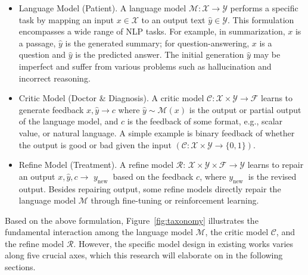 \documentclass[a4paper,oneside]{book}
\begin{document}
\begin{itemize}
    \item Language Model (Patient). A language model $\mathcal{M}: \mathcal{X} \rightarrow \mathcal{Y}$ performs a specific task by mapping an input $x \in \mathcal{X}$ to an output text $\hat{y} \in \mathcal{Y}$. This formulation encompasses a wide range of NLP tasks. For example, in summarization, $x$ is a passage, $\hat{y}$ is the generated summary; for question-answering, $x$ is a question and $\hat{y}$ is the predicted answer. The initial generation $\hat{y}$ may be imperfect and suffer from various problems such as hallucination and incorrect reasoning.

    \item Critic Model (Doctor \& Diagnosis). A critic model $\mathcal{C}: \mathcal{X} \times \mathcal{Y} \rightarrow \mathcal{F}$ learns to generate feedback $x, \hat{y} \rightarrow c$ where $\hat{y} \sim \mathcal{M}(x)$ is the output or partial output of the language model, and $c$ is the feedback of some format, e.g., scalar value, or natural language. A simple example is binary feedback of whether the output is good or bad given the input $(\mathcal{C}: \mathcal{X} \times \mathcal{Y} \rightarrow\{0,1\})$.

    \item Refine Model (Treatment). A refine model $\mathcal{R}$: $\mathcal{X} \times \mathcal{Y} \times \mathcal{F} \rightarrow \mathcal{Y}$ learns to repair an output $x, \hat{y}, c \rightarrow$ $y_{\text {new }}$ based on the feedback $c$, where $y_{\text {new }}$ is the revised output. Besides repairing output, some refine models directly repair the language model $\mathcal{M}$ through fine-tuning or reinforcement learning.
\end{itemize}

Based on the above formulation, Figure~\ref{fig:taxonomy} illustrates the fundamental interaction among the language model $\mathcal{M}$, the critic model $\mathcal{C}$, and the refine model $\mathcal{R}$. However, the specific model design in existing works varies along five crucial axes, which this research will elaborate on in the following sections.
\end{document}
